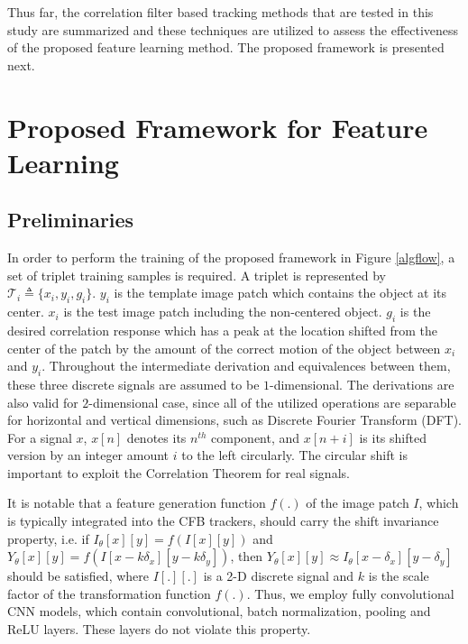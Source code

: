 \documentclass[journal]{IEEEtran}
\begin{document}
Thus far, the correlation filter based tracking methods that are tested in this study are summarized and these techniques are utilized to assess the effectiveness of the proposed feature learning method. The proposed framework is presented next.
\section{Proposed Framework for Feature Learning}
\label{secProposed}
\subsection{Preliminaries}
In order to perform the training of the proposed framework in Figure \ref{algflow}, a set of triplet training samples is required. A triplet is represented by $\mathcal{T}_i \triangleq \{x_i,y_i,g_i\}$. $y_i$ is the template image patch which contains the object at its center. $x_i$ is the test image patch including the non-centered object. $g_i$ is the desired correlation response which has a peak at the location shifted from the center of the patch by the amount of the correct motion of the object between $x_i$ and $y_i$. Throughout the intermediate derivation and equivalences between them, these three discrete signals are assumed to be $1$-dimensional. The derivations are also valid for $2$-dimensional case, since all of the utilized operations are separable for horizontal and vertical dimensions, such as Discrete Fourier Transform (DFT). For a signal $x$, $x[n]$ denotes its $n^{th}$ component, and $x[n+i]$ is its shifted version by an integer amount $i$ to the left circularly. The circular shift is important to exploit the Correlation Theorem for real signals.

It is notable that a feature generation function $f(.)$ of the image patch $I$, which is typically integrated into the CFB trackers, should carry the shift invariance property, i.e. if $I_\theta[x][y]=f(I[x][y])$ and $Y_\theta[x][y]=f(I[x-k\delta_x][y-k\delta_y])$, then $Y_\theta[x][y]\approx I_\theta[x-\delta_x][y-\delta_y]$ should be satisfied, where $I[.][.]$ is a 2-D discrete signal and $k$ is the scale factor of the transformation function $f(.)$. Thus, we employ fully convolutional CNN models, which contain convolutional, batch normalization, pooling and ReLU layers. These layers do not violate this property.
\end{document}
